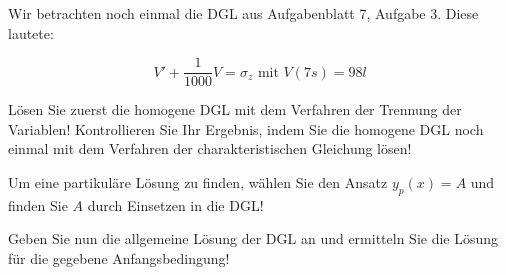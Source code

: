 \item Wir betrachten noch einmal die DGL aus Aufgabenblatt 7, Aufgabe 3. Diese lautete:

$$V' + \frac{1}{1000}V = \sigma_z  \text{ mit } V(7s)=98l$$

Lösen Sie zuerst die homogene DGL mit dem Verfahren der Trennung der Variablen! Kontrollieren Sie Ihr Ergebnis, indem Sie die homogene DGL noch einmal mit dem Verfahren der charakteristischen Gleichung lösen!

Um eine partikuläre Lösung zu finden, wählen Sie den Ansatz $y_p(x) = A$ und finden Sie $A$ durch Einsetzen in die DGL!

Geben Sie nun die allgemeine Lösung der DGL an und ermitteln Sie die Lösung für die gegebene Anfangsbedingung!
